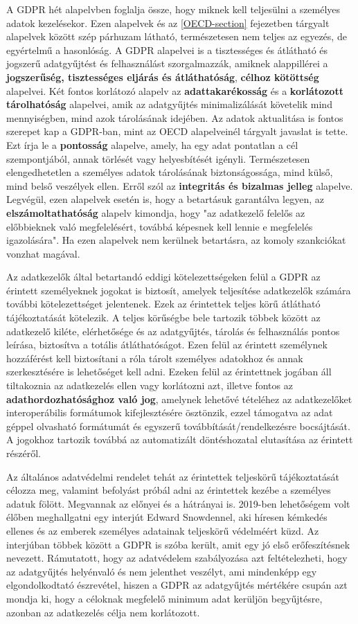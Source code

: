 A GDPR hét alapelvben foglalja össze, hogy miknek kell teljesülni a személyes adatok kezelésekor. Ezen alapelvek és az \ref{OECD-section} fejezetben tárgyalt alapelvek között szép párhuzam látható, természetesen nem teljes az egyezés, de egyértelmű a hasonlóság. A GDPR alapelvei is a tisztességes és átlátható és jogszerű adatgyűjtést és felhasználást szorgalmazzák, amiknek alappillérei a \textbf{jogszerűség, tisztességes eljárás és átláthatóság}, \textbf{célhoz kötöttség} alapelvei. Két fontos korlátozó alapelv az \textbf{adattakarékosság} és a \textbf{korlátozott tárolhatóság} alapelvei, amik az adatgyűjtés minimalizálását követelik mind mennyiségben, mind azok tárolásának idejében. Az adatok aktualitása is fontos szerepet kap a GDPR-ban, mint az OECD alapelveinél tárgyalt javaslat is tette. Ezt írja le a \textbf{pontosság} alapelve, amely, ha egy adat pontatlan a cél szempontjából, annak törlését vagy helyesbítését igényli. Természetesen elengedhetetlen a személyes adatok tárolásának biztonságossága, mind külső, mind belső veszélyek ellen. Erről szól az \textbf{integritás és bizalmas jelleg} alapelve. Legvégül, ezen alapelvek esetén is, hogy a betartásuk garantálva legyen, az \textbf{elszámoltathatóság} alapelv kimondja, hogy "az adatkezelő felelős az előbbieknek való megfelelésért, továbbá képesnek kell lennie e megfelelés igazolására". \cite{GDPR} Ha ezen alapelvek nem kerülnek betartásra, az komoly szankciókat vonzhat magával.

Az adatkezelők által betartandó eddigi kötelezettségeken felül a GDPR az érintett személyeknek jogokat is biztosít, amelyek teljesítése adatkezelők számára további kötelezettséget jelentenek. Ezek az érintettek teljes körű átlátható tájékoztatását kötelezik. A teljes körűségbe bele tartozik többek között az adatkezelő kiléte, elérhetősége és az adatgyűjtés, tárolás és felhasználás pontos leírása, biztosítva a totális átláthatóságot. Ezen felül az érintett személynek hozzáférést kell biztosítani a róla tárolt személyes adatokhoz és annak szerkesztésére is lehetőséget kell adni. Ezeken felül az érintettnek jogában áll tiltakoznia az adatkezelés ellen vagy korlátozni azt, illetve fontos az \textbf{adathordozhatósághoz való jog}, amelynek lehetővé tételéhez az adatkezelőket interoperábilis formátumok kifejlesztésére ösztönzik, ezzel támogatva az adat géppel olvasható formátumát és egyszerű továbbítását/rendelkezésre bocsájtását. A jogokhoz tartozik továbbá az automatizált döntéshozatal elutasítása az érintett részéről.

Az általános adatvédelmi rendelet tehát az érintettek teljeskörű tájékoztatását célozza meg, valamint befolyást próbál adni az érintettek kezébe a személyes adatuk fölött. Megvannak az előnyei és a hátrányai is. 2019-ben lehetőségem volt élőben meghallgatni egy interjút \cite{Snowden} Edward Snowdennel, aki híresen kémkedés ellenes és az emberek személyes adatainak teljeskörű védelméért küzd. Az interjúban többek között a GDPR is szóba került, amit egy jó első erőfeszítésnek nevezett. Rámutatott, hogy az adatvédelem szabályozása azt feltételezheti, hogy az adatgyűjtés helyénvaló és nem jelenthet veszélyt, ami mindenképp egy elgondolkodtató észrevétel, hiszen a GDPR az adatgyűjtés mértékére csupán azt mondja ki, hogy a céloknak megfelelő minimum adat kerüljön begyűjtésre, azonban az adatkezelés célja nem korlátozott.